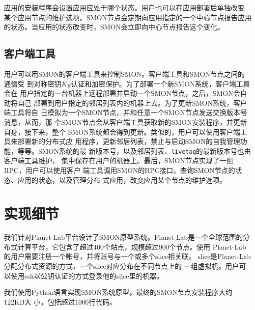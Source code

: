 应用的安装程序会设置应用应处于哪个状态。用户也可以在应用部署后单独改变
某个应用节点的维护选项。SMON节点会定期向应用指定的一个中心节点报告应用
的状态。当应用的状态改变时，SMON会立即向中心节点报告这个变化。

%


\subsection{客户端工具}
\label{subsec:client}

用户可以用SMON的客户端工具来控制SMON。客户端工具和SMON节点之间的通信受
到对称密钥$K_E$认证和加密保护。为了部署一个新SMON系统，客户端工具会在
用户指定的一台机器上远程部署并启动一个SMON节点，之后，SMON会自动将自己
部署到用户指定的邻居列表内的机器上去。为了更新SMON系统，客户端工具将自
己模拟为一个SMON节点，并和任意一个SMON节点发送交换版本号消息，从而，那
个SMON节点会从客户端工具获取新的SMON安装程序，并更新自身，接下来，整个
SMON系统都会得到更新。类似的，用户可以使用客户端工具来部署新的分布式应
用程序，更新邻居列表，禁止与启动SMON的自我管理功能，等等。SMON系统的最
新版本号，以及邻居列表、\texttt{livetag}的最新版本号也由客户端工具维护，
集中保存在用户的机器上。最后，SMON节点实现了一组RPC，用户可以使用客户
端工具调用SMON的RPC接口，查询SMON节点的状态、应用的状态，以及管理分布
式应用，改变应用某个节点的维护选项。

\section{实现细节}
\label{sec:smon_impl}

我们针对Planet-Lab平台设计了SMON原型系统。Planet-Lab是一个全球范围的分
布式计算平台，它包含了超过400个站点，规模超过900个节点。使用
Planet-Lab的用户需要注册一个账号，并将账号与一个或多个slice相关联。
slice是Planet-Lab分配分布式资源的方式，一个slice对应分布在不同节点上的
一组虚拟机。用户可以使用ssh以公钥认证的方式登录他的slice里的机器。

我们使用Python语言实现SMON系统原型。最终的SMON节点安装程序大约122KB大
小，包括超过1000行代码。

